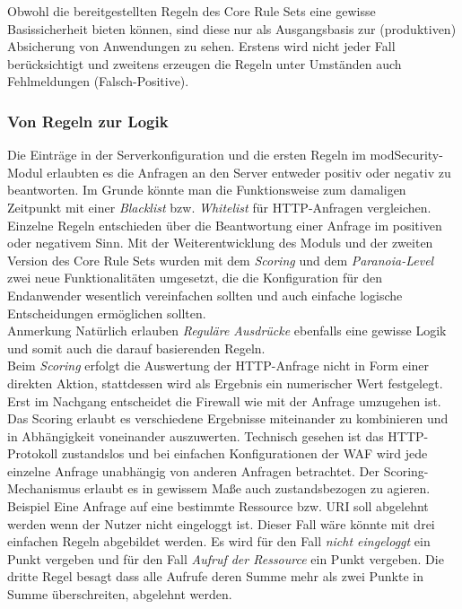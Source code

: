 Obwohl die bereitgestellten Regeln des Core Rule Sets eine gewisse Basissicherheit bieten können, sind diese nur als Ausgangsbasis zur (produktiven) Absicherung von Anwendungen zu sehen. Erstens wird nicht jeder Fall berücksichtigt und zweitens erzeugen die Regeln unter Umständen auch Fehlmeldungen (Falsch-Positive).

\subsubsection{Von Regeln zur Logik}
Die Einträge in der Serverkonfiguration und die ersten Regeln im modSecurity-Modul erlaubten es die Anfragen an den Server entweder positiv oder negativ zu beantworten. Im Grunde könnte man die Funktionsweise zum damaligen Zeitpunkt mit einer \emph{Blacklist} bzw. \emph{Whitelist} für HTTP-Anfragen vergleichen. Einzelne Regeln entschieden über die Beantwortung einer Anfrage im positiven oder negativem Sinn. Mit der Weiterentwicklung des Moduls und der zweiten Version des Core Rule Sets wurden mit dem \emph{Scoring} und dem \emph{Paranoia-Level} zwei neue Funktionalitäten umgesetzt, die die Konfiguration für den Endanwender wesentlich vereinfachen sollten und auch einfache logische Entscheidungen ermöglichen sollten.\\

\textcolor{bhtGray}{ Anmerkung} Natürlich erlauben \emph{Reguläre Ausdrücke} ebenfalls eine gewisse Logik und somit auch die darauf basierenden Regeln.\\

Beim \emph{Scoring} erfolgt die Auswertung der HTTP-Anfrage nicht in Form einer direkten Aktion, stattdessen wird als Ergebnis ein numerischer Wert festgelegt. Erst im Nachgang entscheidet die Firewall wie mit der Anfrage umzugehen ist. Das Scoring erlaubt es verschiedene Ergebnisse miteinander zu kombinieren und in Abhängigkeit voneinander auszuwerten. Technisch gesehen ist das HTTP-Protokoll zustandslos und bei einfachen Konfigurationen der WAF  wird jede einzelne Anfrage unabhängig von anderen Anfragen betrachtet. Der Scoring-Mechanismus erlaubt es in gewissem Maße auch zustandsbezogen zu agieren. \\


\textcolor{bhtGray}{ Beispiel} Eine Anfrage auf eine bestimmte Ressource bzw. URI soll abgelehnt werden wenn der Nutzer nicht eingeloggt ist. Dieser Fall wäre könnte mit drei einfachen Regeln abgebildet werden. Es wird für den Fall \emph{nicht eingeloggt} ein Punkt vergeben und für den Fall \emph{Aufruf der Ressource} ein Punkt vergeben. Die dritte Regel besagt dass alle Aufrufe deren Summe mehr als zwei Punkte in Summe überschreiten, abgelehnt werden.\\

